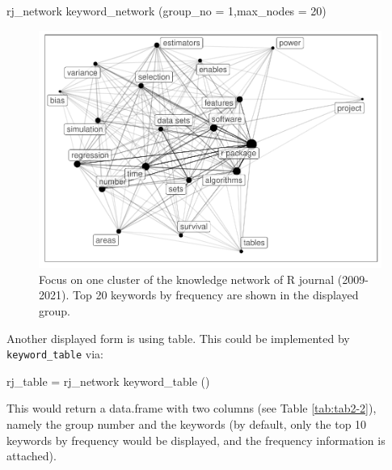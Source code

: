 \begin{Schunk}
\begin{Sinput}
rj_network %
  keyword_network (group_no = 1,max_nodes = 20) 
\end{Sinput}
\begin{figure}

{\centering \includegraphics[width=1\linewidth]{akc_files/figure-latex/fig5-1} 

}

\caption[Focus on one cluster of the knowledge network of R journal (2009-2021)]{Focus on one cluster of the knowledge network of R journal (2009-2021). Top 20 keywords by frequency are shown in the displayed group.}\label{fig:fig5}
\end{figure}
\end{Schunk}

Another displayed form is using table. This could be implemented by
\texttt{keyword\_table} via:

\begin{Schunk}
\begin{Sinput}
rj_table = rj_network %
  keyword_table () 
\end{Sinput}
\end{Schunk}

This would return a data.frame with two columns (see Table
\ref{tab:tab2-2}), namely the group number and the keywords (by default,
only the top 10 keywords by frequency would be displayed, and the
frequency information is attached).

